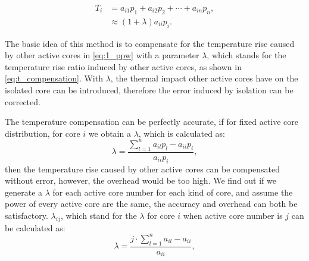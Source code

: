 \begin{equation}\label{eq:t_compensation}
\begin{split}
T_{i} &=a_{i1}p_{1} + a_{i2}p_{2} +\cdots + a_{in}p_{n},\\
&\approx(1+\lambda)a_{ii}p_{i}.
\end{split}
\end{equation}

The basic idea of this method is to compensate for the temperature rise caused by other active cores in \eqref{eq:1_ppw} with a parameter $\lambda$, which stands for the temperature rise ratio induced by other active cores, as shown in \eqref{eq:t_compensation}. With $\lambda$, the thermal impact other active cores have on the isolated core can be introduced, therefore the error induced by isolation can be corrected.

The temperature compensation can be perfectly accurate, if for fixed active core distribution, for core $i$ we obtain a $\lambda$, which is calculated as:
\begin{equation}\label{eq:lambda_accuracy}
\lambda =\frac{\sum_{l=1}^{n}a_{il}p_{l}-a_{ii}p_{i}}{a_{ii}p_{i}},
\end{equation}
then the temperature rise caused by other active cores can be compensated without error, however, the overhead would be too high. We find out if we generate a $\lambda$ for each active core number for each kind of core, and assume the power of every active core are the same, the accuracy and overhead can both be satisfactory. $\lambda_{ij}$, which stand for the $\lambda$ for core $i$ when active core number is $j$ can be calculated as:
\begin{equation}\label{eq:lambda}
\lambda =\frac{j \cdot \sum_{l=1}^{n}a_{il}-a_{ii}}{a_{ii}},
\end{equation}


